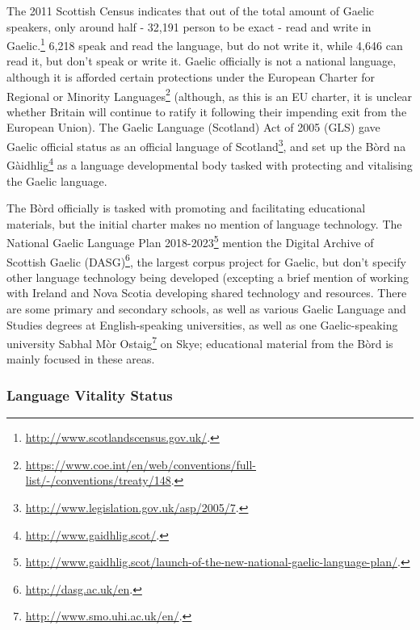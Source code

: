 The 2011 Scottish Census indicates that out of the total amount of Gaelic speakers, only around half - 32,191 person to be exact - read and write in Gaelic.\footnote{\href{http://www.scotlandscensus.gov.uk/}{http://www.scotlandscensus.gov.uk/}. } 6,218 speak and read the language, but do not write it, while 4,646 can read it, but don't speak or write it. Gaelic officially is not a national language, although it is afforded certain protections under the European Charter for Regional or Minority Languages\footnote{\href{https://www.coe.int/en/web/conventions/full-list/-/conventions/treaty/148}{https://www.coe.int/en/web/conventions/full-list/-/conventions/treaty/148}. } (although, as this is an EU charter, it is unclear whether Britain will continue to ratify it following their impending exit from the European Union). The Gaelic Language (Scotland) Act of 2005 (GLS) gave Gaelic official status as an official language of Scotland\footnote{\href{http://www.legislation.gov.uk/asp/2005/7}{http://www.legislation.gov.uk/asp/2005/7}. }, and set up the B\`ord na G\`aidhlig\footnote{\href{http://www.gaidhlig.scot/}{http://www.gaidhlig.scot/}. } as a language developmental body tasked with protecting and vitalising the Gaelic language.

The B\`ord officially is tasked with promoting and facilitating educational materials, but the initial charter makes no mention of language technology. The National Gaelic Language Plan 2018-2023\footnote{\href{http://www.gaidhlig.scot/launch-of-the-new-national-gaelic-language-plan/}{http://www.gaidhlig.scot/launch-of-the-new-national-gaelic-language-plan/}. } \citep{bord2018national} mention the Digital Archive of Scottish Gaelic (DASG)\footnote{\href{http://dasg.ac.uk/en}{http://dasg.ac.uk/en}. }, the largest corpus project for Gaelic, but don't specify other language technology being developed (excepting a brief mention of working with Ireland and Nova Scotia developing shared technology and resources. There are some primary and secondary schools, as well as various Gaelic Language and Studies degrees at English-speaking universities, as well as one Gaelic-speaking university Sabhal M\`or Ostaig\footnote{\href{http://www.smo.uhi.ac.uk/en/}{http://www.smo.uhi.ac.uk/en/}. } on Skye; educational material from the B\`ord is mainly focused in these areas.

\subsubsection{Language Vitality Status}

